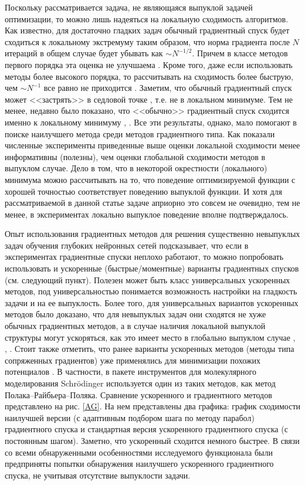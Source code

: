   Поскольку рассматривается задача, не являющаяся выпуклой задачей оптимизации, то можно лишь надеяться на локальную сходимость алгоритмов. Как известно, для достаточно гладких задач обычный градиентный спуск будет сходиться к локальному экстремуму таким образом, что норма градиента после $N$ итераций в общем случае будет убывать как $\sim N^{-1/2}$. Причем в классе методов первого порядка эта оценка не улучшаема  \cite{carmon2017lower2}. Кроме того, даже если использовать методы более высокого порядка, то рассчитывать на сходимость более быструю, чем $\sim N^{-1}$ все равно не приходится \cite{carmon2017lower1}. Заметим, что обычный градиентный спуск может <<застрять>> в седловой точке \cite{nesterov2013introductory}, т.е. не в локальном минимуме. Тем не менее, недавно было показано, что <<обычно>> градиентный спуск сходится именно к локальному минимуму \cite{lee2017first}, \cite{lee2016gradient}. Все эти результаты, однако, мало помогают в поиске наилучшего метода среди методов градиентного типа. Как показали численные эксперименты приведенные выше оценки локальной сходимости менее информативны (полезны), чем оценки глобальной сходимости методов в выпуклом случае. Дело в том, что в некоторой окрестности (локального) минимума можно рассчитывать на то, что поведение оптимизируемой функции с хорошей точностью соответствует поведению выпуклой функции. И хотя для рассматриваемой в  данной статье задаче априорно это совсем не очевидно, тем не менее, в экспериментах локально выпуклое поведение вполне подтверждалось.  

  Опыт использования градиентных методов для решения существенно невыпуклых задач обучения глубоких нейронных сетей \cite{Goodfellow2017} подсказывает, что если в экспериментах градиентные спуски неплохо работают, то можно попробовать использовать и ускоренные (быстрые/моментные) варианты градиентных спусков (см. следующий пункт). 
  Полезен может быть класс универсальных ускоренных методов, под универсальностью понимается возможность настройки на гладкость задачи и на ее выпуклость. Более того, для универсальных вариантов ускоренных методов было доказано, что для невыпуклых задач они сходятся не хуже обычных градиентных методов, а в случае наличия локальной выпуклой структуры могут ускоряться, как это имеет место в глобально выпуклом случае \cite{ghadimi2015generalized}, \cite{guminov2019accelerated}, \cite{guminov2019universal}. Стоит также отметить, что ранее варианты ускоренных методов (методы типа сопряженных градиентов) уже применялись для минимизации похожих потенциалов \cite{wales1997global}. В частности, в пакете инструментов для молекулярного моделирования Schrödinger \cite{sastry2013protein} используется один из таких методов, как метод Полака--Райбьера--Поляка. Сравнение ускоренного и градиентного методов представлено на рис. \ref{AG}.  На нем представлены два графика: график сходимости наилучшей версии (с адаптивным подбором шага по методу парабол) градиентного спуска и стандартная версия ускоренного градиентного спуска (с постоянным шагом). Заметно, что ускоренный сходится немного быстрее. В связи со всеми обнаруженными особенностями исследуемого функционала были предприняты попытки обнаружения наилучшего ускоренного градиентного спуска, не учитывая отсутствие выпуклости задачи. 

